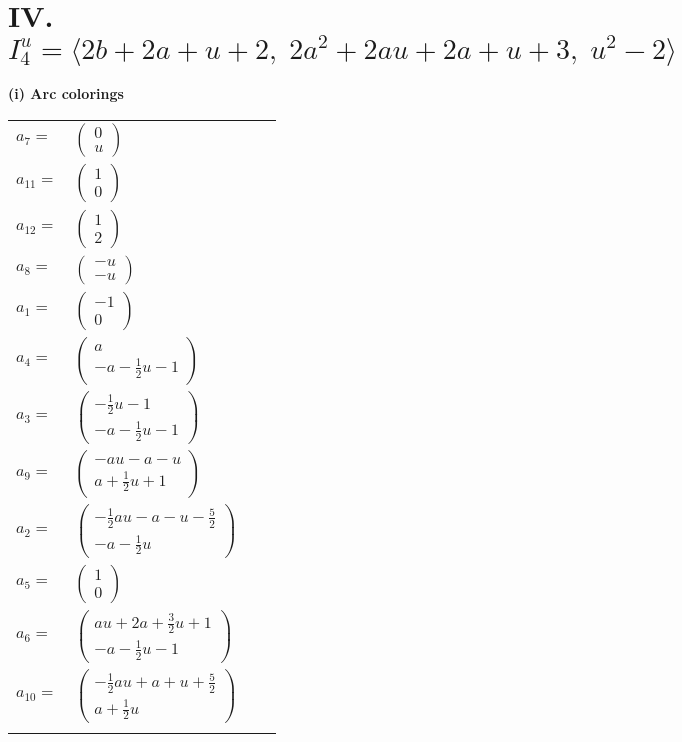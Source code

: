 \documentclass[1p]{elsarticle_modified}
\theoremstyle{definition}
\begin{document}
\centering \section*{IV. $I^u_{4}= \langle 2 b+2 a+u+2,\;2 a^2+2 a u+2 a+u+3,\;u^2-2 \rangle$}
\flushleft \textbf{(i) Arc colorings}\\
\begin{tabular}{m{7pt} m{180pt} m{7pt} m{180pt} }
\flushright $a_{7}=$&$\begin{pmatrix}0\\u\end{pmatrix}$ \\
\flushright $a_{11}=$&$\begin{pmatrix}1\\0\end{pmatrix}$ \\
\flushright $a_{12}=$&$\begin{pmatrix}1\\2\end{pmatrix}$ \\
\flushright $a_{8}=$&$\begin{pmatrix}- u\\- u\end{pmatrix}$ \\
\flushright $a_{1}=$&$\begin{pmatrix}-1\\0\end{pmatrix}$ \\
\flushright $a_{4}=$&$\begin{pmatrix}a\\- a-\frac{1}{2} u-1\end{pmatrix}$ \\
\flushright $a_{3}=$&$\begin{pmatrix}-\frac{1}{2} u-1\\- a-\frac{1}{2} u-1\end{pmatrix}$ \\
\flushright $a_{9}=$&$\begin{pmatrix}- a u- a- u\\a+\frac{1}{2} u+1\end{pmatrix}$ \\
\flushright $a_{2}=$&$\begin{pmatrix}-\frac{1}{2} a u- a- u-\frac{5}{2}\\- a-\frac{1}{2} u\end{pmatrix}$ \\
\flushright $a_{5}=$&$\begin{pmatrix}1\\0\end{pmatrix}$ \\
\flushright $a_{6}=$&$\begin{pmatrix}a u+2 a+\frac{3}{2} u+1\\- a-\frac{1}{2} u-1\end{pmatrix}$ \\
\flushright $a_{10}=$&$\begin{pmatrix}-\frac{1}{2} a u+a+u+\frac{5}{2}\\a+\frac{1}{2} u\end{pmatrix}$\\&\end{tabular}
\end{document}
